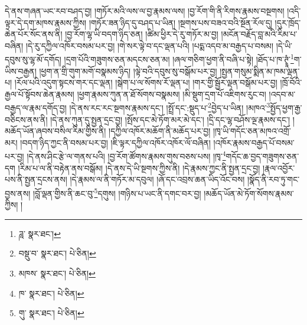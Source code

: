 དེ་ནས་གཞན་ཡང་རབ་བཤད་བྱ། །གཏོར་མའི་ལས་ལ་བྱ་རྣམས་ལས། །བྱ་རོག་གི་ནི་རིགས་རྣམས་བསྔགས། །འདི་ལྟར་དེ་དག་མཁས་རྣམས་ཀྱིས། །གཏོར་ཟན་ཉིད་དུ་བཤད་པ་ཡིན། །སྔགས་པས་བཟའ་བའི་སྔོན་རོལ་དུ། །དུར་ཁྲོད་ཆེན་པོར་སོང་ནས་ནི། །བྱ་རོག་ལྷ་ཡི་བདག་ཉིད་ཅན། །ཚིམ་ཕྱིར་དེ་རུ་གཏོར་མ་བྱ། །མངོན་བརྗོད་བླ་མའི་རིམ་པ་བཞིན། །དེ་རུ་དཀྱིལ་འཁོར་བསམ་པར་བྱ། །གེ་སར་ལྟེ་བ་དང་ལྡན་པའི། །པདྨ་འདབ་མ་བརྒྱད་པ་བསམ། །དེ་ཡི་དབུས་སུ་ལྷ་མོ་དགོད། །དྲག་པོའི་གཟུགས་ཅན་མདངས་ཅན་མ། །ཞལ་གཅིག་ཕྱག་ནི་བཞི་པ་སྟེ། །ཐོད་པ་ཁ་ཊྭཱཾ་\footnote{ཌཱ་  སྣར་ཐང་། }ག་ཡིས་བརྒྱན། །ཕྱག་ན་གྲི་གུག་མགོ་བསྣམས་ཉིད། །ལྟེ་བའི་དབུས་སུ་བསྒོམ་པར་བྱ། །སྤྱན་གསུམ་སྨིན་མ་ཁམ་ལྡན་པ། །རོལ་པའི་འདུག་སྟངས་གར་དང་ལྡན། །སྒེག་པ་ལ་སོགས་རོ་ལྡན་པ། །གར་གྱི་སྦྱོར་ལྡན་བསྒོམ་པར་བྱ། །ཁྲོ་བོའི་རྒྱལ་པོ་སྟོབས་ཆེན་རྣམས། །ཕྱག་རྣམས་ཀུན་ན་ཐོ་སོགས་བསྣམས། །མི་སྡུག་དྲག་པོ་འཇིགས་རུང་བ། །འདབ་མ་བརྒྱད་ལ་རྣམ་དགོད་བྱ། །དེ་ནས་རང་རང་སྔགས་རྣམས་དང་། །སྤྲོ་དང་:སྡུད་པ་\footnote{བསྡུ་བ་  སྣར་ཐང་།  པེ་ཅིན། }བྱེད་པ་ཡིན། །མཁའ་\footnote{མཁས་  སྣར་ཐང་།  པེ་ཅིན། }སྤྱོད་ཕྱག་རྒྱ་བཅིངས་ནས་ནི། །དེ་ནས་ཀུན་དུ་སྤྱན་དྲང་བྱ། །སྤོས་དང་མེ་ཏོག་མར་མེ་དང་། །དྲི་དང་ལྷ་བཤོས་ལྔ་རྣམས་དང་། །མཆོད་ཡོན་ཞབས་བསིལ་རིམ་གྱིས་ནི། །དཀྱིལ་འཁོར་མཆོག་ནི་མཆོད་པར་བྱ། །ཁྭ་ཡི་གདོང་ཅན་མཁའ་འགྲོ་མར། །བདག་ཉིད་ཀྱང་ནི་བསམ་པར་བྱ། །ཇི་ལྟར་དཀྱིལ་འཁོར་འཁོར་ལོ་བཞིན། །འཁོར་རྣམས་བརྒྱད་པོ་བསམ་པར་བྱ། །དེ་ནས་ཤིང་རྩེ་ལ་གནས་པའི། །བྱ་རོག་ཚོགས་རྣམས་གུས་བཅས་པས། །ཁྭ་\footnote{ཁ་  སྣར་ཐང་།  པེ་ཅིན། }གདོང་ཆ་བྱད་གཟུགས་ཅན་དག །རིམ་པ་ལ་ནི་བརྟེན་ནས་བསྒོམ། །དེ་ནས་དེ་ཡི་སྔགས་ཀྱིས་ནི། །དེ་རྣམས་ཀྱང་ནི་སྤྱན་དྲང་བྱ། །རྣལ་འབྱོར་པས་ནི་སྤྱན་དྲངས་ནས། །དེ་རྣམས་ལ་ནི་གཏོར་མ་དབུལ། །ཞོ་དང་འབྲས་ཆན་ཡིད་འོང་བས། །སྣོད་ནི་རབ་ཏུ་གང་བྱས་ནས། །བློ་ལྡན་གྱིས་ནི་ཆང་བུ་\footnote{གུ་  སྣར་ཐང་།  པེ་ཅིན། }དགུས། །གཉིས་པ་ཡང་ནི་དགང་བར་བྱ། །མཆོད་ཡོན་མེ་ཏོག་སོགས་རྣམས་ཀྱིས། །
